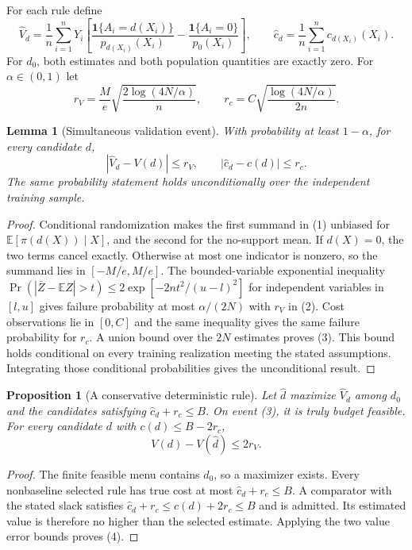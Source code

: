 \documentclass[11pt]{article}
\newtheorem{proposition}[theorem]{Proposition}
\newtheorem{lemma}[theorem]{Lemma}
\theoremstyle{definition}
\begin{document}
For each rule define
\[
 \widehat V_d=\frac1n\sum_{i=1}^nY_i
 \left[\frac{\mathbf1\{A_i=d(X_i)\}}{p_{d(X_i)}(X_i)}
       -\frac{\mathbf1\{A_i=0\}}{p_0(X_i)}\right],
 \qquad
 \widehat c_d=\frac1n\sum_{i=1}^n c_{d(X_i)}(X_i).
 \tag{1}
\]
For $d_0$, both estimates and both population quantities are exactly zero. For $\alpha\in(0,1)$ let
\[
 r_V=\frac{M}{e}\sqrt{\frac{2\log(4N/\alpha)}{n}},\qquad
 r_c=C\sqrt{\frac{\log(4N/\alpha)}{2n}}.
 \tag{2}
\]

\begin{lemma}[Simultaneous validation event]
With probability at least $1-\alpha$, for every candidate $d$,
\[
 |\widehat V_d-V(d)|\leq r_V,\qquad
 |\widehat c_d-c(d)|\leq r_c.
 \tag{3}
\]
The same probability statement holds unconditionally over the independent training sample.
\end{lemma}
\begin{proof}
Conditional randomization makes the first summand in (1) unbiased for $\mathbb E[\pi(d(X))\mid X]$, and the second for the no-support mean. If $d(X)=0$, the two terms cancel exactly. Otherwise at most one indicator is nonzero, so the summand lies in $[-M/e,M/e]$. The bounded-variable exponential inequality
$\Pr(|\bar Z-\mathbb EZ|>t)\leq2\exp[-2nt^2/(u-l)^2]$
for independent variables in $[l,u]$ gives failure probability at most $\alpha/(2N)$ with $r_V$ in (2). Cost observations lie in $[0,C]$ and the same inequality gives the same failure probability for $r_c$. A union bound over the $2N$ estimates proves (3). This bound holds conditional on every training realization meeting the stated assumptions. Integrating those conditional probabilities gives the unconditional result.
\end{proof}

\begin{proposition}[A conservative deterministic rule]
Let $\widehat d$ maximize $\widehat V_d$ among $d_0$ and the candidates satisfying $\widehat c_d+r_c\leq B$. On event (3), it is truly budget feasible. For every candidate $d$ with $c(d)\leq B-2r_c$,
\[
 V(d)-V(\widehat d)\leq2r_V.
 \tag{4}
\]
\end{proposition}
\begin{proof}
The finite feasible menu contains $d_0$, so a maximizer exists. Every nonbaseline selected rule has true cost at most $\widehat c_d+r_c\leq B$. A comparator with the stated slack satisfies $\widehat c_d+r_c\leq c(d)+2r_c\leq B$ and is admitted. Its estimated value is therefore no higher than the selected estimate. Applying the two value error bounds proves (4).
\end{proof}
\end{document}

